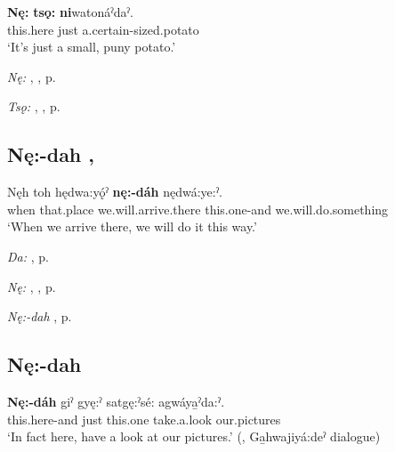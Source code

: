 \ea
\label{ex:npar118}
\gll \textbf{Nę:} \textbf{tsǫ:} \textbf{ni}watonáˀdaˀ. \\
this.here just a.certain-sized.potato\\
\glt ‘It’s just a small, puny potato.’
\z

\begin{CayugaRelated}
\item \textit{Nę:} , , p. \pageref{p:[nę:] ‘this, these’}\\
\item \textit{Tsǫ:} , , p. \pageref{p:[tsǫ:]}
\end{CayugaRelated}

\subsection*{\textbf{Nę:-dah} , } \label{p:[nę:-dah] `this’, ‘this way’}

\ea
\label{ex:npar107}
\gll Nęh toh hędwa:yǫ́ˀ \textbf{nę:-dáh} nędwá:ye:ˀ. \\
when that.place we.will.arrive.there this.one-and we.will.do.something\\
\glt ‘When we arrive there, we will do it this way.’
\z

\begin{CayugaRelated}
\item \textit{Da:} , p. \pageref{p:[da:]}\\
\item \textit{Nę:} , , p. \pageref{p:[nę:] ‘this, these’}\\
\item \textit{Nę:-dah} , p. \pageref{p:[nę:-dah] ‘Here!’}
\end{CayugaRelated}


\subsection*{\textbf{Nę:-dah} } \label{p:[nę:-dah] ‘Here!’}

\ea
\label{ex:npar108}
\gll \textbf{Nę:-dáh} giˀ gyę:ˀ satgę:ˀsé: agwáya̱ˀda:ˀ. \\
this.here-and just this.one take.a.look our.pictures\\
\glt ‘In fact here, have a look at our pictures.’ (\cite[257]{mithun_watewayestanih_1984}, Ga̱hwajiyá:deˀ dialogue)
\z

